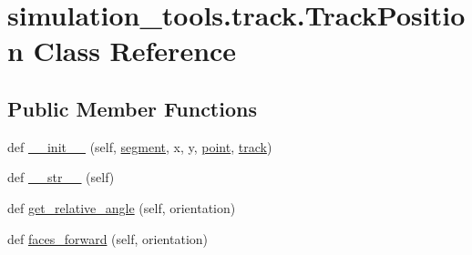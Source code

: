 \hypertarget{classsimulation__tools_1_1track_1_1_track_position}{}\section{simulation\+\_\+tools.\+track.\+Track\+Position Class Reference}
\label{classsimulation__tools_1_1track_1_1_track_position}
\subsection*{Public Member Functions}
\begin{DoxyCompactItemize}
\item 
def \hyperlink{classsimulation__tools_1_1track_1_1_track_position_a05040be982ee5680d839a98dc15a26c9}{\+\_\+\+\_\+init\+\_\+\+\_\+} (self, \hyperlink{classsimulation__tools_1_1track_1_1_track_position_ab5feb6f2789576c88fe7310f28e4c4db}{segment}, x, y, \hyperlink{classsimulation__tools_1_1track_1_1_track_position_a5c5ad2aecf6e00e6611e8ad70b38de7b}{point}, \hyperlink{namespacesimulation__tools_1_1track_ac731095c2502c445d46302406cb81651}{track})
\item 
def \hyperlink{classsimulation__tools_1_1track_1_1_track_position_a7c60c719686ae3ae47ce5dbaad6ffbc4}{\+\_\+\+\_\+str\+\_\+\+\_\+} (self)
\item 
def \hyperlink{classsimulation__tools_1_1track_1_1_track_position_ae4cf3681d7edde291e3c566cfb21397a}{get\+\_\+relative\+\_\+angle} (self, orientation)
\item 
def \hyperlink{classsimulation__tools_1_1track_1_1_track_position_a9b8177f89baa57821fd94123a364447c}{faces\+\_\+forward} (self, orientation)
\end{DoxyCompactItemize}
